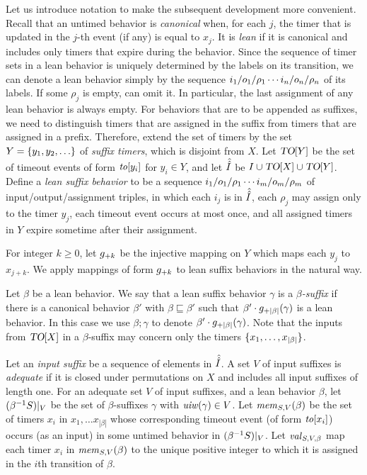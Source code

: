 Let us introduce notation to make the subsequent development more convenient. 
Recall that an untimed behavior is \emph{canonical} when, for each $j$,
the timer that is updated in the $j$-th event (if any) is equal to $x_j$.
It is {\em lean} if it is canonical and
includes only timers that expire during the behavior. 
Since the sequence of timer sets in a lean behavior is
uniquely determined by the labels on its transition, we can
denote a lean behavior simply by the sequence
$i_1/o_1/\rho_1 \cdots i_n/o_n/\rho_n$ of its labels.
If some $\rho_j$ is empty, can omit it. In particular, the last assignment of
any lean behavior is always empty.
For behaviors that are to be appended as suffixes, we need to distinguish
timers that are assigned in the suffix from timers that are assigned in a prefix.
Therefore, extend the set of timers by the set $Y = \lbrace y_1,y_2,\ldots\rbrace$ of
{\em suffix timers}, which is disjoint from $X$.
Let $\mbox{\sl TO}[Y]$ be the set of timeout events of form
$\mathit{to}[y_i]$ for $y_i \in Y$, and let
$\hat{\hat{I}}$ be $I \cup \mbox{\sl TO}[X] \cup \mbox{\sl TO}[Y]$.
Define a {\em lean suffix behavior} to be a sequence
$i_1/o_1/\rho_1 \cdots i_m/o_m/\rho_m$ of input/output/assignment triples,
in which each $i_j$ is in $\hat{\hat{I}}$, 
each $\rho_j$ may assign only to the timer $y_j$,
each timeout event occurs at most once,
and all assigned timers in $Y$ expire sometime after their assignment.

For integer $k \geq 0$, let $g_{+{k}}$ be the injective mapping on
$Y$ which maps each $y_j$ to $x_{j+k}$.  We apply mappings of form
$g_{+{k}}$ to lean suffix behaviors in the natural way.

Let $\beta$ be a lean behavior. We say that 
a lean suffix behavior $\gamma$ is a {\em $\beta$-suffix} if
there is a canonical behavior $\beta'$ with $\beta \sqsubseteq \beta'$ such that
$\beta'\cdot g_{+{|\beta|}}(\gamma)$ is a lean behavior. In this case we
use $\beta;\gamma$ to denote $\beta'\cdot g_{+{|\beta|}}(\gamma)$.
Note that the inputs from $\mbox{\sl TO}[X]$ in a $\beta$-suffix may concern only
the timers $\lbrace x_1, \ldots, x_{|\beta|}\rbrace$.

Let an {\em input suffix} be a sequence of elements in $\hat{\hat{I}}$.
A set $V$ of input suffixes is {\em adequate} if it is closed under permutations
on $X$ and includes all input suffixes of length one.
For an adequate set $V$ of input suffixes, and a lean behavior $\beta$,
let $({\beta}^{-1}{S})|_{V}$ be the set of $\beta$-suffixes $\gamma$
with $\mathit{uiw}(\gamma) \in V$.
Let $\mathit{mem}_{S,V}(\beta)$ be the set of timers $x_i$ in
$x_1 , \ldots x_{|\beta|}$ whose corresponding timeout event
(of form $\mathit{to}[x_i]$) occurs (as an input) in some untimed behavior in
$({\beta}^{-1}{S})|_{V}$.
Let $\mathit{val}_{S,V,\beta}$ map each timer $x_i$ in
$\mathit{mem}_{S,V}(\beta)$ to the unique positive integer to which it
is assigned in the $i$th transition of $\beta$.


